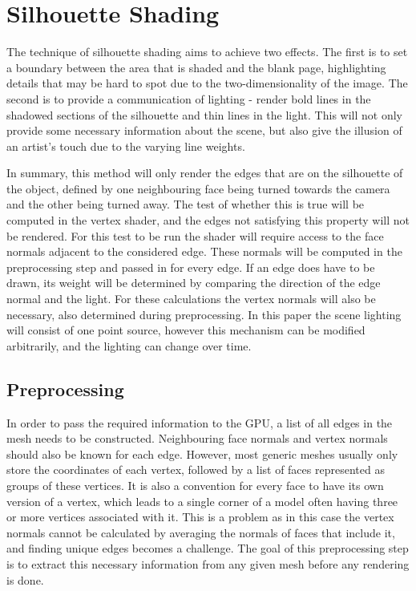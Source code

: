 \documentclass[a4paper, 12pt]{article}
\begin{document}
\section{Silhouette Shading}

The technique of silhouette shading aims to achieve two effects. The first is to set a boundary between the area that is shaded and the blank page, highlighting details that may be hard to spot due to the two-dimensionality of the image. The second is to provide a communication of lighting - render bold lines in the shadowed sections of the silhouette and thin lines in the light. This will not only provide some necessary information about the scene, but also give the illusion of an artist's touch due to the varying line weights.

In summary, this method will only render the edges that are on the silhouette of the object, defined by one neighbouring face being turned towards the camera and the other being turned away. The test of whether this is true will be computed in the vertex shader, and the edges not satisfying this property will not be rendered. For this test to be run the shader will require access to the face normals adjacent to the considered edge. These normals will be computed in the preprocessing step and passed in for every edge. If an edge does have to be drawn, its weight will be determined by comparing the direction of the edge normal and the light. For these calculations the vertex normals will also be necessary, also determined during preprocessing. In this paper the scene lighting will consist of one point source, however this mechanism can be modified arbitrarily, and the lighting can change over time.

\subsection{Preprocessing}

In order to pass the required information to the GPU, a list of all edges in the mesh needs to be constructed. Neighbouring face normals and vertex normals should also be known for each edge. However, most generic meshes usually only store the coordinates of each vertex, followed by a list of faces represented as groups of these vertices. It is also a convention for every face to have its own version of a vertex, which leads to a single corner of a model often having three or more vertices associated with it. This is a problem as in this case the vertex normals cannot be calculated by averaging the normals of faces that include it, and finding unique edges becomes a challenge. The goal of this preprocessing step is to extract this necessary information from any given mesh before any rendering is done.
\end{document}
